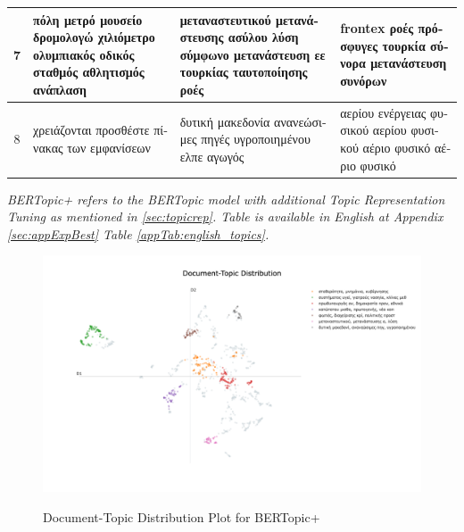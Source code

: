 \begin{table}[H]
{\begin{tabular}{|c|m{4.5cm}|m{4.5cm}|m{4.5cm}|}
\hline
7 & \textgreek{πόλη μετρό μουσείο δρομολογώ χιλιόμετρο ολυμπιακός οδικός σταθμός αθλητισμός ανάπλαση} & \textgreek{μεταναστευτικού μετανάστευσης ασύλου λύση σύμφωνο μετανάστευση εε τουρκίας ταυτοποίησης ροές} & frontex \textgreek{ροές πρόσφυγες τουρκία σύνορα μετανάστευση συνόρων} \\
\hline
8 & \textgreek{χρειάζονται προσθέστε πίνακας των εμφανίσεων} & \textgreek{δυτική μακεδονία ανανεώσιμες πηγές υγροποιημένου ελπε αγωγός} & \textgreek{αερίου ενέργειας φυσικού αερίου φυσικού αέριο φυσικό αέριο φυσικό} \\
\hline
\end{tabular}
}
\begin{tablenotes}
  \small
  \item \textit{BERTopic+ refers to the BERTopic model with additional Topic Representation Tuning as mentioned in \ref{sec:topicrep}. Table is available in English at Appendix \ref{sec:appExpBest} Table \ref{appTab:english_topics}.}
\end{tablenotes}
\end{table}

\begin{figure}[H]
\centering
\caption[Document-Topic Plot]{Document-Topic Distribution Plot for BERTopic+}
\includegraphics[width=1\columnwidth]{figs/document_topic_plot.png}
\label{fig:doc_topic_plot}
\end{figure}